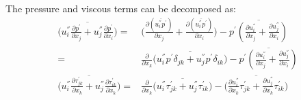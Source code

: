 The pressure and viscous terms can be decomposed as:
\begin{equation}
  \begin{split}
    \biggl( \overline{ u^{''}_i \frac{\partial 
        p^{'}}{\partial x_j} + u^{''}_j \frac{\partial p^{'}}{\partial 
        x_i} } \biggr) = & \biggl( \frac{\partial (\overline{u^{''}_i 
        p^{'}}) }{\partial x_j} + \frac{\partial (\overline{u^{''}_i 
        p^{'}})}{\partial x_i} \biggr) - \overline{p^{'}(
      \frac{\partial u^{''}_i}{\partial x_j}+\frac{\partial u^{''}_j}{
        \partial x_i})}\\
    = & \frac{\partial}{\partial x_k} \biggl(\overline{u^{''}_i 
        p^{'} \delta_{jk} + u^{''}_j p^{'} \delta_{ik}   }\biggr) 
      - \overline{p^{'}( \frac{\partial u^{''}_i}{\partial x_j}+
        \frac{\partial u^{''}_j}{\partial x_i})}\\
      \biggl( \overline{u^{''}_i \frac{\partial 
      \tau^{'}_{jk}}{\partial x_k} + u^{''}_j \frac{\partial 
      \tau^{'}_{ik}}{\partial x_k}} \biggr) = & \frac{\partial}{
    \partial x_k} \biggl( \overline{u^{''}_i \tau^{'}_{jk} +
    u^{''}_j \tau^{'}_{ik}} \biggr) - \biggl( \overline{\frac{
      \partial u^{''}_i }{\partial x_k} \tau^{'}_{jk} + \frac{
      \partial u^{''}_j }{\partial x_k} \tau^{'}_{ik}} \biggr) \\
  \end{split}
\end{equation}

